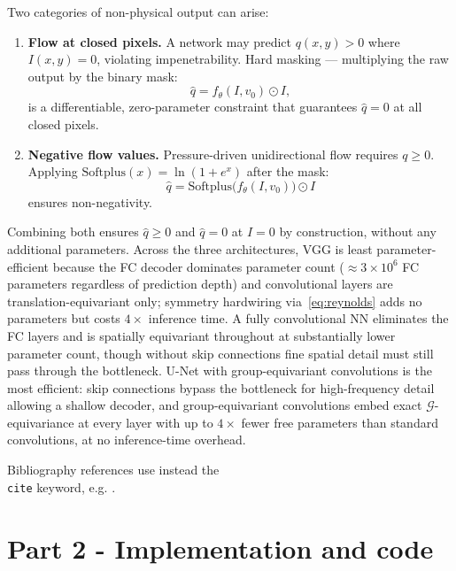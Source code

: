 \documentclass[conference,compsoc]{IEEEtran}
\begin{document}
Two categories of non-physical output can arise:
\begin{enumerate}[noitemsep,topsep=0pt]
  \item \textbf{Flow at closed pixels.} A network may predict $q(x,y)>0$ where $I(x,y)=0$, violating impenetrability. Hard masking — multiplying the raw output by the binary mask:
    \begin{equation}
      \hat{q} = f_\theta(I,v_0)\odot I,
      \label{eq:masking}
    \end{equation}
    is a differentiable, zero-parameter constraint that guarantees $\hat{q}=0$ at all closed pixels.
  \item \textbf{Negative flow values.} Pressure-driven unidirectional flow requires $q\ge0$. Applying $\mathrm{Softplus}(x)=\ln(1+e^x)$ after the mask:
    \begin{equation}
      \hat{q} = \mathrm{Softplus}\!\bigl(f_\theta(I,v_0)\bigr)\odot I
      \label{eq:nonneg}
    \end{equation}
    ensures non-negativity.
\end{enumerate}
Combining both ensures $\hat{q}\ge0$ and $\hat{q}=0$ at $I=0$ by construction, without any additional parameters. Across the three architectures, VGG is least parameter-efficient because the FC decoder dominates parameter count ($\approx3\times10^6$ FC parameters regardless of prediction depth) and convolutional layers are translation-equivariant only; symmetry hardwiring via~\eqref{eq:reynolds} adds no parameters but costs $4\times$ inference time. A fully convolutional NN eliminates the FC layers and is spatially equivariant throughout at substantially lower parameter count, though without skip connections fine spatial detail must still pass through the bottleneck. U-Net with group-equivariant convolutions is the most efficient: skip connections bypass the bottleneck for high-frequency detail allowing a shallow decoder, and group-equivariant convolutions embed exact $\mathcal{G}$-equivariance at every layer with up to $4\times$ fewer free parameters than standard convolutions, at no inference-time overhead.

Bibliography references use instead the \texttt{\\cite} keyword, e.g. \cite{IEEEhowto:kopka}.

\section{Part 2 - Implementation and code}
\end{document}
